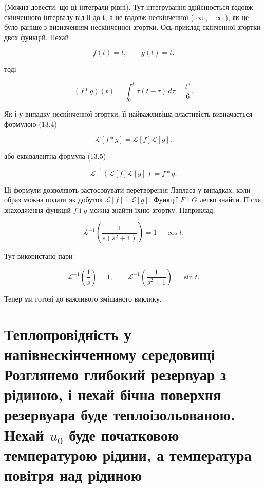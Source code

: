 \documentclass[
  ukrainian,
]{article}
\begin{document}
(Можна довести, що ці інтеграли рівні). Тут інтегрування здійснюється
вздовж скінченного інтервалу від 0 до t, а не вздовж нескінченної (
\(\infty\) , \(+\infty\) ), як це було раніше з визначенням нескінченної
згортки. Ось приклад скінченної згортки двох функцій. Нехай

\[
f(t)=t,\qquad g(t)=t.
\]

тоді

\[
(f * g)(t)=\int_0^t \tau(t-\tau)\,d\tau=\frac{t^3}{6}.
\]

Як і у випадку нескінченної згортки, її найважливіша властивість
визначається формулою (13.4)

\[
\mathcal{L}[f*g]=\mathcal{L}[f]\mathcal{L}[g].
\]

або еквівалентна формула (13.5)

\[
\mathcal{L}^{-1}\!\left(\mathcal{L}[f]\mathcal{L}[g]\right)=f*g.
\]

Ці формули дозволяють застосовувати перетворення Лапласа у випадках,
коли образ можна подати як добуток \(\mathcal{L}[f]\) і
\(\mathcal{L}[g]\). Функції \(F\) і \(G\) легко знайти. Після
знаходження функцій \(f\) і \(g\) можна знайти їхню згортку. Наприклад,

\[
\mathcal{L}^{-1}\!\left(\frac{1}{s(s^2+1)}\right)=1-\cos t.
\]

Тут використано пари

\[
\mathcal{L}^{-1}\!\left(\frac{1}{s}\right)=1,\qquad
\mathcal{L}^{-1}\!\left(\frac{1}{s^2+1}\right)=\sin t.
\]

Тепер ми готові до важливого змішаного виклику.

\section{\texorpdfstring{Теплопровідність у напівнескінченному
середовищі Розглянемо глибокий резервуар з рідиною, і нехай бічна
поверхня резервуара буде теплоізольованою. Нехай \(u_0\) буде початковою
температурою рідини, а температура повітря над рідиною
---}{Теплопровідність у напівнескінченному середовищі Розглянемо глибокий резервуар з рідиною, і нехай бічна поверхня резервуара буде теплоізольованою. Нехай u\_0 буде початковою температурою рідини, а температура повітря над рідиною ---}}\label{ux442ux435ux43fux43bux43eux43fux440ux43eux432ux456ux434ux43dux456ux441ux442ux44c-ux443-ux43dux430ux43fux456ux432ux43dux435ux441ux43aux456ux43dux447ux435ux43dux43dux43eux43cux443-ux441ux435ux440ux435ux434ux43eux432ux438ux449ux456-ux440ux43eux437ux433ux43bux44fux43dux435ux43cux43e-ux433ux43bux438ux431ux43eux43aux438ux439-ux440ux435ux437ux435ux440ux432ux443ux430ux440-ux437-ux440ux456ux434ux438ux43dux43eux44e-ux456-ux43dux435ux445ux430ux439-ux431ux456ux447ux43dux430-ux43fux43eux432ux435ux440ux445ux43dux44f-ux440ux435ux437ux435ux440ux432ux443ux430ux440ux430-ux431ux443ux434ux435-ux442ux435ux43fux43bux43eux456ux437ux43eux43bux44cux43eux432ux430ux43dux43eux44e.-ux43dux435ux445ux430ux439-u_0-ux431ux443ux434ux435-ux43fux43eux447ux430ux442ux43aux43eux432ux43eux44e-ux442ux435ux43cux43fux435ux440ux430ux442ux443ux440ux43eux44e-ux440ux456ux434ux438ux43dux438-ux430-ux442ux435ux43cux43fux435ux440ux430ux442ux443ux440ux430-ux43fux43eux432ux456ux442ux440ux44f-ux43dux430ux434-ux440ux456ux434ux438ux43dux43eux44e}
\end{document}
